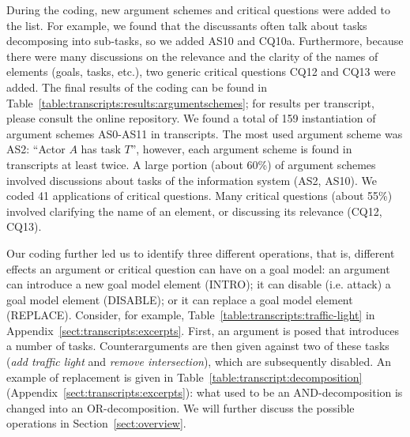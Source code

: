 During the coding, new argument schemes and critical questions were added to the list. For example, we found that the discussants often talk about tasks decomposing into sub-tasks, so we added AS10 and CQ10a. Furthermore, because there were many discussions on the relevance and the clarity of the names of elements (goals, tasks, etc.), two generic critical questions CQ12 and CQ13 were added. The final results of the coding can be found in Table~\ref{table:transcripts:results:argumentschemes}; for results per transcript, please consult the online repository. We found a total of 159 instantiation of argument schemes AS0-AS11 in transcripts. The most used argument scheme was AS2: ``Actor $A$ has task $T$'', however, each argument scheme is found in transcripts at least twice. A large portion (about 60\%) of argument schemes involved discussions about tasks of the information system (AS2, AS10). We coded 41 applications of critical questions. Many critical questions (about 55\%) involved clarifying the name of an element, or discussing its relevance (CQ12, CQ13).

Our coding further led us to identify three different operations, that is, different effects an argument or critical question can have on a goal model: an argument can introduce a new goal model element (\textsf{INTRO}); it can disable (i.e. attack) a goal model element (\textsf{DISABLE}); or it can replace a goal model element (\textsf{REPLACE}). Consider, for example, Table~\ref{table:transcripts:traffic-light} in Appendix~\ref{sect:transcripts:excerpts}. First, an argument is posed that introduces a number of tasks. Counterarguments are then given against two of these tasks (\emph{add traffic light} and \emph{remove intersection}), which are subsequently disabled. An example of replacement is given in Table~\ref{table:transcript:decomposition} (Appendix~\ref{sect:transcripts:excerpts}): what used to be an AND-decomposition is changed into an OR-decomposition. We will further discuss the possible operations in Section~\ref{sect:overview}.




